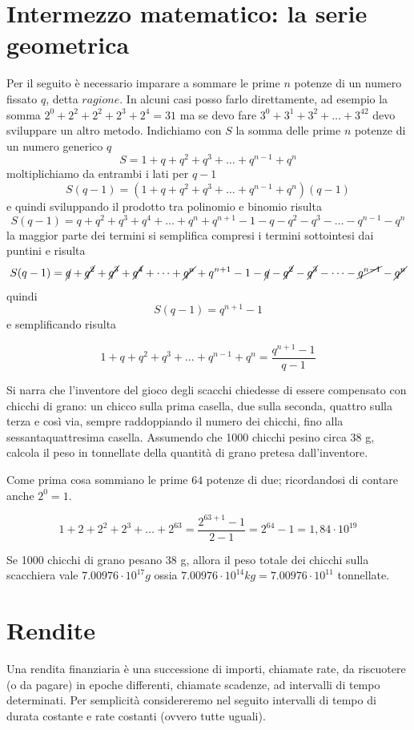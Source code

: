 \section{Intermezzo matematico: la serie geometrica} Per il seguito è necessario 
imparare a sommare le prime $n$ potenze di un numero fissato $q$, detta 
$ragione$. In alcuni casi posso farlo direttamente, ad esempio la somma 
$2^0+2^2+2^2+2^3+2^4=31$ ma se devo fare $3^0+3^1+3^2+\dots+3^{42}$ devo 
sviluppare un altro metodo. Indichiamo con $S$ la somma delle prime $n$ potenze 
di un numero generico $q$ $$ S= 1+q+q^2+q^3+\dots + q^{n-1}+q^n$$ moltiplichiamo 
da entrambi i lati per $q-1$ $$ S(q-1)= (1+q+q^2+q^3+\dots + q^{n-1}+q^n)(q-1)$$ 
e quindi sviluppando il prodotto tra polinomio e binomio risulta $$ S(q-1)= 
q+q^2+q^3+q^4+\dots + q^{n}+q^{n+1}-1-q-q^2-q^3-\dots - q^{n-1}-q^n$$ la maggior 
parte dei termini si semplifica compresi i termini sottointesi dai puntini e 
risulta $$ S(q-1)= \cancel{q}+\cancel{q^2}+\cancel{q^3}+\cancel{q^4}+\dots + 
\cancel{q^n}+q^{n+1}-1-\cancel{q}-\cancel{q^2}-\cancel{q^3}-\dots - 
\cancel{q^{n-1}}-\cancel{q^n}$$ quindi $$S(q-1)=q^{n+1}-1 $$ e semplificando 
risulta \begin{definizione} $$ 1+q+q^2+q^3+\dots + 
q^{n-1}+q^n=\dfrac{q^{n+1}-1}{q-1} $$ \end{definizione}

\begin{exrig} \begin{esempio} Si narra che l’inventore del gioco degli scacchi 
chiedesse di essere compensato con chicchi di grano: un chicco sulla prima 
casella, due sulla seconda, quattro sulla terza e così via, sempre raddoppiando 
il numero dei chicchi, fino alla sessantaquattresima casella. Assumendo che 1000 
chicchi pesino circa 38 g, calcola il peso in tonnellate della quantità di grano 
pretesa dall’inventore.

Come prima cosa sommiano le prime $64$ potenze di due; ricordandosi di contare 
anche $2^0=1$.

$$ 1+2+2^2+2^3+\dots + 2^63=\dfrac{2^{63+1}-1}{2-1}=2^{64}-1=1,84 \cdot10^{19}$$

Se 1000 chicchi di grano pesano 38 g, allora il peso totale dei chicchi sulla 
scacchiera vale  $7.00976\cdot10^{17} g$ ossia $7.00976\cdot10^{14} kg = 
7.00976\cdot10^{11}$ tonnellate. 

\end{esempio} \end{exrig}

\section{Rendite} Una rendita finanziaria è una successione di importi, chiamate 
rate, da riscuotere (o da pagare) in epoche differenti, chiamate scadenze, ad 
intervalli di tempo determinati. Per semplicità considereremo nel seguito 
intervalli di tempo di durata costante e rate costanti (ovvero tutte uguali).

